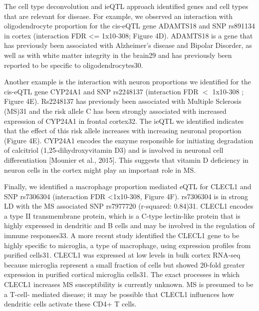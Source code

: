 The cell type deconvolution and ieQTL approach identified genes and cell types that are relevant for disease. For example, we observed an interaction with oligodendrocyte proportion for the cis-eQTL gene ADAMTS18 and SNP rs891134 in cortex (interaction FDR <= 1x10-308; Figure 4D). ADAMTS18 is a gene that has previously been associated with Alzheimer’s disease and Bipolar Disorder, as well as with white matter integrity in the brain29 and has previously been reported to be specific to oligodendrocytes30.  

Another example is the interaction with neuron proportions we identified for the cis-eQTL gene CYP24A1 and SNP rs2248137 (interaction FDR $<$ 1x10-308 ; Figure 4E). Rs2248137 has previously been associated with Multiple Sclerosis (MS)31 and the risk allele C has been strongly associated with increased expression of CYP24A1 in frontal cortex32. The ieQTL we identified indicates that the effect of this risk allele increases with increasing neuronal proportion (Figure 4E). CYP24A1 encodes the enzyme responsible for initiating degradation of calcitriol (1,25-dihydroxyvitamin D3) and is involved in neuronal cell differentiation [Mounier et al., 2015]. This suggests that vitamin D deficiency in neuron cells in the cortex might play an important role in MS.  

Finally, we identified a macrophage proportion mediated eQTL for CLECL1 and SNP rs7306304 (interaction  FDR <1x10-308, Figure 4F). rs7306304 is in strong LD with the MS associated SNP rs7977720 (r-squared: 0.84)31. CLECL1 encodes a type II transmembrane protein, which is a C-type lectin-like protein that is highly expressed in dendritic and B cells and may be involved in the regulation of immune responses33. A more recent study identified the CLECL1 gene to be highly specific to microglia, a type of macrophage, using expression profiles from purified cells31. CLECL1 was expressed at low levels in bulk cortex RNA-seq because microglia represent a small fraction of cells but showed 20-fold greater expression in purified cortical microglia cells31. The exact processes in which CLECL1 increases MS susceptibility is currently unknown. MS is presumed to be a T-cell- mediated disease; it may be possible that CLECL1 influences how dendritic cells activate these CD4+ T cells. 


